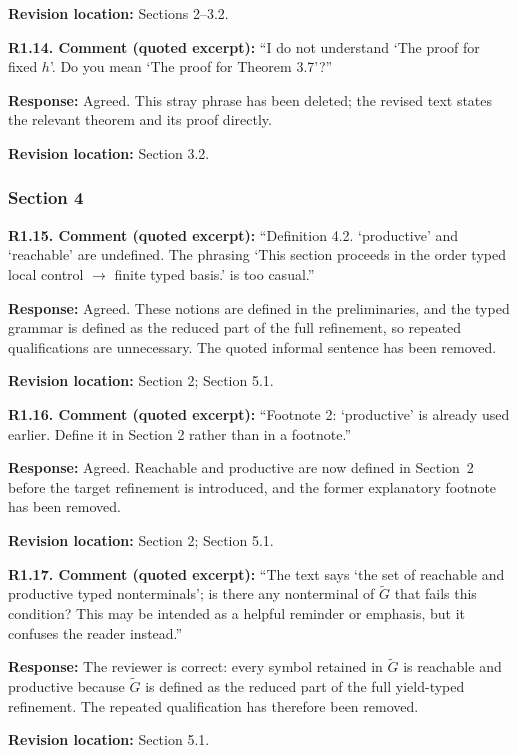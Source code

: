 \documentclass[
  10pt,
  a4paper,
]{article}
\begin{document}
\textbf{Revision location:} Sections 2--3.2.


\textbf{R1.14. Comment (quoted excerpt):} ``I do not understand `The proof for
fixed \(h\)'. Do you mean `The proof for Theorem 3.7'?''

\textbf{Response:} Agreed. This stray phrase has been deleted; the
revised text states the relevant theorem and its proof directly.

\textbf{Revision location:} Section 3.2.


\subsubsection{Section 4}\label{section-4}

\textbf{R1.15. Comment (quoted excerpt):} ``Definition 4.2. `productive' and
`reachable' are undefined. The phrasing `This section proceeds in the
order typed local control \(\to\) finite typed basis.' is too casual.''

\textbf{Response:} Agreed. These notions are defined in the
preliminaries, and the typed grammar is defined as the reduced part of the
full refinement, so repeated qualifications are unnecessary. The
quoted informal sentence has been removed.

\textbf{Revision location:} Section 2; Section 5.1.


\textbf{R1.16. Comment (quoted excerpt):} ``Footnote 2: `productive' is already
used earlier. Define it in Section 2 rather than in a footnote.''

\textbf{Response:} Agreed. Reachable and productive are now defined in Section~2 before the
target refinement is introduced, and the former explanatory footnote has
been removed.

\textbf{Revision location:} Section 2; Section 5.1.


\textbf{R1.17. Comment (quoted excerpt):} ``The text says `the set of reachable and productive typed nonterminals'; is there any nonterminal of $\tilde{G}$ that fails this condition? This may be intended as a helpful reminder or emphasis, but it confuses the reader instead.''

\textbf{Response:} The reviewer is correct: every symbol retained in
$\widetilde G$ is reachable and productive because $\widetilde G$ is defined
as the reduced part of the full yield-typed refinement. The repeated
qualification has therefore been removed.

\textbf{Revision location:} Section 5.1.
\end{document}
